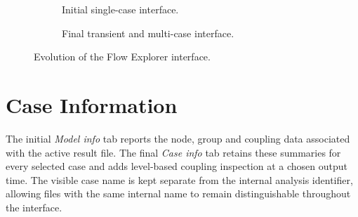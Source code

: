 \begin{figure}[!htbp]
    \centering

    \begin{subfigure}[t]{0.9\textwidth}
        \centering
        \caption{Initial single-case interface.}
        \label{fig:appendix_original_flow_explorer}
    \end{subfigure}

    \vspace{0.8em}

    \begin{subfigure}[t]{0.96\textwidth}
        \centering
        \caption{Final transient and multi-case interface.}
        \label{fig:appendix_final_flow_explorer}
    \end{subfigure}

    \caption{Evolution of the Flow Explorer interface.}
    \label{fig:appendix_flow_explorer_evolution}
\end{figure}

\FloatBarrier

\section{Case Information}
\label{appsec:case_information_evolution}

The initial \textit{Model info} tab reports the node, group and coupling data
associated with the active result file. The final \textit{Case info} tab
retains these summaries for every selected case and adds level-based coupling
inspection at a chosen output time. The visible case name is kept separate
from the internal analysis identifier, allowing files with the same internal
name to remain distinguishable throughout the interface.

